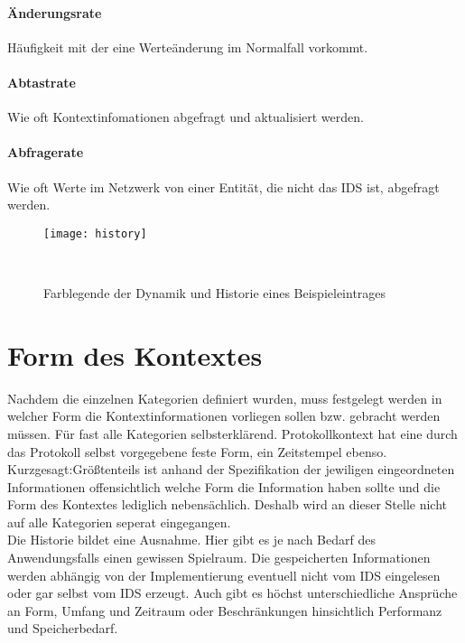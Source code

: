 \paragraph{Änderungsrate} 
Häufigkeit mit der eine Werteänderung im Normalfall vorkommt.
\paragraph{Abtastrate}
Wie oft Kontextinfomationen abgefragt und aktualisiert werden.
\paragraph{Abfragerate}
Wie oft Werte im Netzwerk von einer Entität, die nicht das IDS ist, abgefragt werden.
\begin{figure}[H]
\centering
\texttt{[image: history]}
\caption{Farblegende der Dynamik und Historie eines Beispieleintrages}
\
\end{figure}


\section{Form des Kontextes}
Nachdem die einzelnen Kategorien definiert wurden, muss festgelegt werden in welcher Form die Kontextinformationen vorliegen sollen bzw. gebracht werden müssen. Für fast alle Kategorien selbsterklärend. Protokollkontext hat eine durch das Protokoll selbst vorgegebene feste Form, ein Zeitstempel ebenso. Kurzgesagt:Größtenteils ist anhand der Spezifikation der jewiligen eingeordneten Informationen offensichtlich welche Form die Information haben sollte und die Form des Kontextes lediglich nebensächlich. Deshalb wird an dieser Stelle nicht auf alle Kategorien seperat eingegangen.\\
Die Historie bildet eine Ausnahme. Hier gibt es je nach Bedarf des Anwendungsfalls einen gewissen Spielraum. Die gespeicherten Informationen werden abhängig von der Implementierung eventuell nicht vom IDS eingelesen oder gar selbst vom IDS erzeugt. Auch gibt es höchst unterschiedliche Ansprüche an Form, Umfang und Zeitraum oder Beschränkungen hinsichtlich Performanz und Speicherbedarf.
